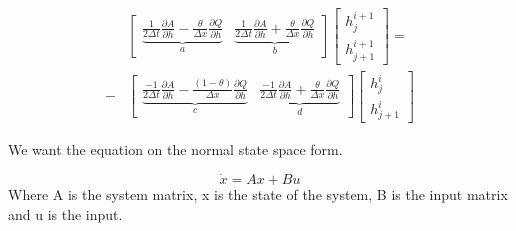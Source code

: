 \begin{equation}
\begin{aligned}
	&\begin{bmatrix}
		\underbrace{\frac{1}{2\Delta t}\frac{\partial A}{\partial h}-\frac{\theta}{\Delta x}\frac{\partial Q}{\partial h}}_{a} & \underbrace{\frac{1}{2\Delta t}\frac{\partial A}{\partial h}+\frac{\theta}{\Delta x}\frac{\partial Q}{\partial h}}_{b} 
	\end{bmatrix}
	\begin{bmatrix}
		h_{j}^{i+1} \\
		h_{j+1}^{i+1}
	\end{bmatrix}
	= \\ -
	&\begin{bmatrix}
		\underbrace{\frac{-1}{2\Delta t}\frac{\partial A}{\partial h}-\frac{(1-\theta)}{\Delta x}\frac{\partial Q}{\partial h}}_{c} & \underbrace{\frac{-1}{2\Delta t}\frac{\partial A}{\partial h}+\frac{\theta}{\Delta x}\frac{\partial Q}{\partial h}}_{d} 
	\end{bmatrix}
	\begin{bmatrix}
		h_{j}^{i} \\
		h_{j+1}^{i}
	\end{bmatrix}
	\end{aligned}
\end{equation}

We want the equation on the normal state space form.

\begin{equation}
	\dot{x} = Ax + Bu
\end{equation}
Where A is the system matrix, x is the state of the system, B is the input matrix and u is the input. 

